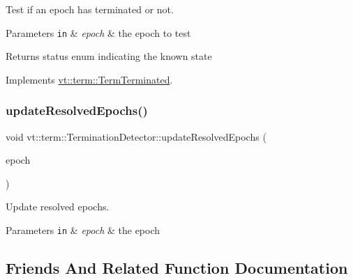 Test if an epoch has terminated or not. 


\begin{DoxyParams}[1]{Parameters}
\mbox{\tt in}  & {\em epoch} & the epoch to test\\
\hline
\end{DoxyParams}
\begin{DoxyReturn}{Returns}
status enum indicating the known state 
\end{DoxyReturn}


Implements \hyperlink{structvt_1_1term_1_1_term_terminated_a9d23b646c13a95738f72f7abfc8774c7}{vt\+::term\+::\+Term\+Terminated}.

\mbox{\label{structvt_1_1term_1_1_termination_detector_a7637035e3f3c0f898d8dc79bbc2d8bf4}} 
\subsubsection{\texorpdfstring{update\+Resolved\+Epochs()}{updateResolvedEpochs()}}
{\footnotesize\ttfamily void vt\+::term\+::\+Termination\+Detector\+::update\+Resolved\+Epochs (\begin{DoxyParamCaption}\item[{\hyperlink{namespacevt_a81d11b28122d43bf9834577e4a06440f}{Epoch\+Type} const \&}]{epoch }\end{DoxyParamCaption})\hspace{0.3cm}{\ttfamily [private]}}



Update resolved epochs. 


\begin{DoxyParams}[1]{Parameters}
\mbox{\tt in}  & {\em epoch} & the epoch \\
\hline
\end{DoxyParams}


\subsection{Friends And Related Function Documentation}
\mbox{\label{structvt_1_1term_1_1_termination_detector_a9c0b991de134b4bc5bebf051bd067b9f}} 
